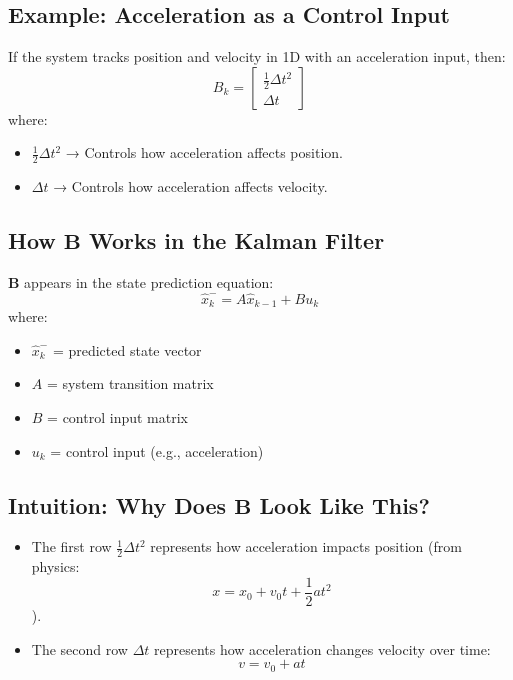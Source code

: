 \documentclass{article}
\begin{document}
\subsection*{Example: Acceleration as a Control Input}
If the system tracks position and velocity in 1D with an acceleration input, then:
\[
B_k =
\begin{bmatrix}
\frac{1}{2} \Delta t^2 \\
\Delta t
\end{bmatrix}
\]
where:
\begin{itemize}
    \item \( \frac{1}{2} \Delta t^2 \) → Controls how acceleration affects position.
    \item \( \Delta t \) → Controls how acceleration affects velocity.
\end{itemize}

\subsection*{How \(\mathbf{B}\) Works in the Kalman Filter}
\(\mathbf{B}\) appears in the state prediction equation:
\[
\hat{x}_k^- = A \hat{x}_{k-1} + B u_k
\]
where:
\begin{itemize}
    \item \( \hat{x}_k^- \) = predicted state vector
    \item \( A \) = system transition matrix
    \item \( B \) = control input matrix
    \item \( u_k \) = control input (e.g., acceleration)
\end{itemize}

\subsection*{Intuition: Why Does \(\mathbf{B}\) Look Like This?}
\begin{itemize}
    \item The first row \( \frac{1}{2} \Delta t^2 \) represents how acceleration impacts position (from physics: 
    \[
    x = x_0 + v_0 t + \frac{1}{2} a t^2
    \]
    ).
    \item The second row \( \Delta t \) represents how acceleration changes velocity over time:  
    \[
    v = v_0 + a t
    \]
\end{itemize}
\end{document}
